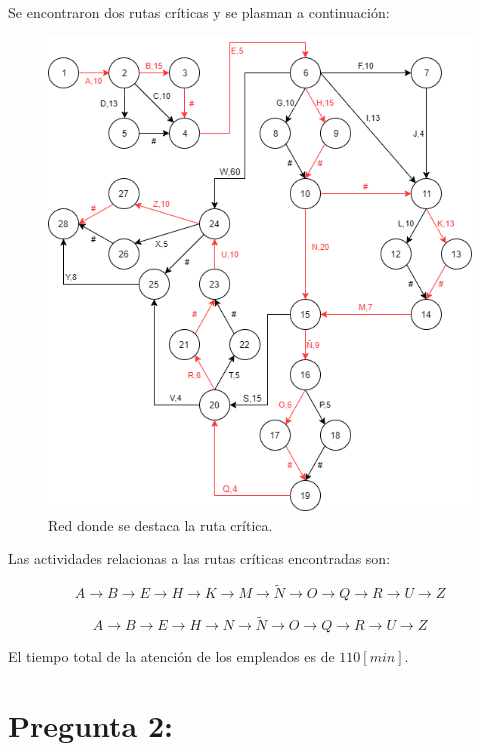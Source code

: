 \documentclass[]{article}
\begin{document}
\newpage
Se encontraron dos rutas críticas y se plasman a continuación:

\begin{figure}[ht] 
\centering
\includegraphics[scale=0.56]{imagenes/ruta_critica.png}
\caption{Red donde se destaca la ruta crítica.}
\end{figure}

Las actividades relacionas a las rutas críticas encontradas son:

$$A\longrightarrow{}B\longrightarrow{}E\longrightarrow{}H\longrightarrow{}K\longrightarrow{}M\longrightarrow{}\tilde{N}\longrightarrow{}O\longrightarrow{}Q\longrightarrow{}R\longrightarrow{}U\longrightarrow{}Z$$

$$A\longrightarrow{}B\longrightarrow{}E\longrightarrow{}H\longrightarrow{}N\longrightarrow{}\tilde{N}\longrightarrow{}O\longrightarrow{}Q\longrightarrow{}R\longrightarrow{}U\longrightarrow{}Z$$

El tiempo total de la atención de los empleados es de $110 [min]$.

\newpage
\section{Pregunta 2:}
\end{document}
